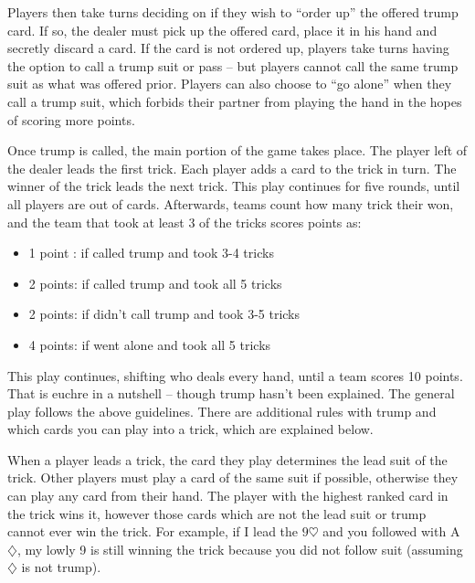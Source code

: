 Players then take turns deciding on if they wish to ``order up'' the offered trump card. If so, the dealer must pick up the offered card,
place it in his hand and secretly discard a card. If the card is not ordered up, players take turns having the option to call a trump suit
or pass -- but players cannot call the same trump suit as what was offered prior. Players can also choose to ``go alone'' when they call
a trump suit, which forbids their partner from playing the hand in the hopes of scoring more points.

Once trump is called, the main portion of the game takes place. The player left of the dealer leads the first trick. Each player adds a card
to the trick in turn. The winner of the trick leads the next trick. This play continues for five rounds, until all players are out of cards.
Afterwards, teams count how many trick their won, and the team that took at least 3 of the tricks scores points as:
\begin{itemize}[noitemsep, label={}]
    \item 1 point : if called trump and took 3-4 tricks
    \item 2 points: if called trump and took all 5 tricks
    \item 2 points: if didn't call trump and took 3-5 tricks
    \item 4 points: if went alone and took all 5 tricks
\end{itemize}

This play continues, shifting who deals every hand, until a team scores 10 points. That is euchre in a nutshell -- though trump hasn't been explained.
The general play follows the above guidelines. There are additional rules with trump and which cards you can play into a trick, which are explained below.

When a player leads a trick, the card they play determines the lead suit of the trick. Other players must play a card of the same suit
if possible, otherwise they can play any card from their hand. The player with the highest ranked card in the trick wins it, however those cards
which are not the lead suit or trump cannot ever win the trick. For example, if I lead the $9\heartsuit$ and you followed with A$\diamondsuit$, my
lowly 9 is still winning the trick because you did not follow suit (assuming $\diamondsuit$ is not trump).

